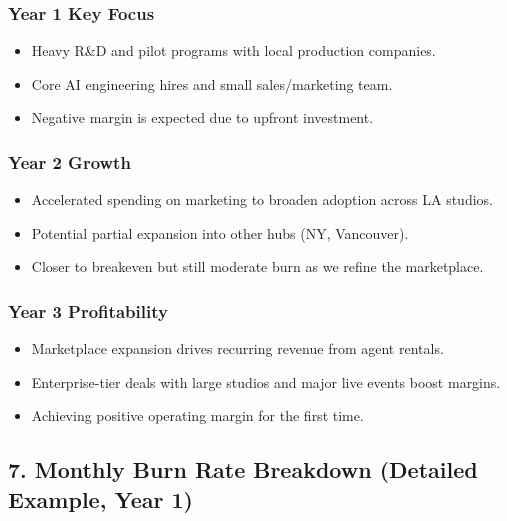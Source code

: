 \documentclass[11pt]{article}
\begin{document}
\subsubsection*{Year 1 Key Focus}
\begin{itemize}
    \item Heavy R\&D and pilot programs with local production companies.
    \item Core AI engineering hires and small sales/marketing team.
    \item Negative margin is expected due to upfront investment.
\end{itemize}

\subsubsection*{Year 2 Growth}
\begin{itemize}
    \item Accelerated spending on marketing to broaden adoption across LA studios.
    \item Potential partial expansion into other hubs (NY, Vancouver).
    \item Closer to breakeven but still moderate burn as we refine the marketplace.
\end{itemize}

\subsubsection*{Year 3 Profitability}
\begin{itemize}
    \item Marketplace expansion drives recurring revenue from agent rentals.
    \item Enterprise-tier deals with large studios and major live events boost margins.
    \item Achieving positive operating margin for the first time.
\end{itemize}

\subsection{7. Monthly Burn Rate Breakdown (Detailed Example, Year 1)}
\end{document}
